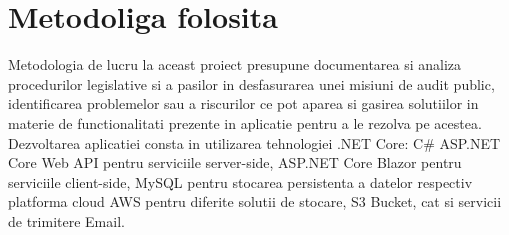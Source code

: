 \section*{Metodoliga folosita}
Metodologia de lucru la aceast proiect presupune documentarea si analiza procedurilor legislative si a pasilor in desfasurarea unei misiuni de audit public, identificarea problemelor sau a riscurilor ce pot aparea si gasirea solutiilor in materie de functionalitati prezente in aplicatie pentru a le rezolva pe acestea. Dezvoltarea aplicatiei consta in utilizarea tehnologiei .NET Core:
C\# ASP.NET Core Web API pentru serviciile server-side, ASP.NET Core Blazor pentru serviciile client-side, MySQL pentru stocarea persistenta a datelor respectiv platforma cloud AWS pentru diferite solutii de stocare, S3 Bucket, cat si  servicii de trimitere Email.
   

